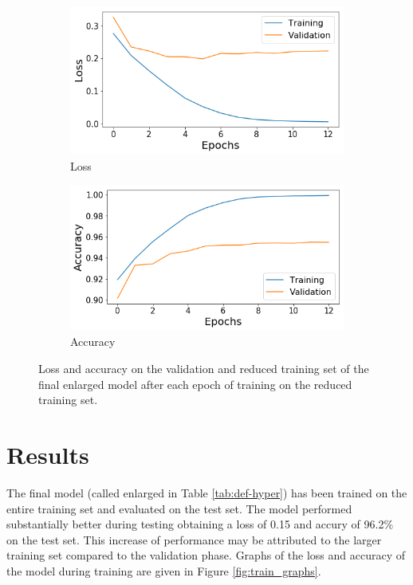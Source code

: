 \documentclass[12pt]{article}
\begin{document}
\begin{figure}[h]
	\centering
	\begin{subfigure}{0.49\textwidth}
		\includegraphics[width=\linewidth]{val_loss}
		\caption{Loss}
		\label{fig:valA}
	\end{subfigure}
	\hspace*{\fill} %
	\begin{subfigure}{0.49\textwidth}
		\includegraphics[width=\linewidth]{val_acc}
		\caption{Accuracy}
		\label{fig:valB}
	\end{subfigure}
	\caption{Loss and accuracy on the validation and reduced training set of the final enlarged model after each epoch of training on the reduced training set.}
	\label{fig:val_graphs}
\end{figure}



\section*{Results}

The final model (called enlarged in Table \ref{tab:def-hyper}) has been trained on the entire training set and evaluated on the test set. The model performed substantially better during testing obtaining a loss of 0.15 and accury of 96.2\% on the test set. This increase of performance may be attributed to the larger training set compared to the validation phase. Graphs of the loss and accuracy of the model during training are given in Figure \ref{fig:train_graphs}.
\end{document}
